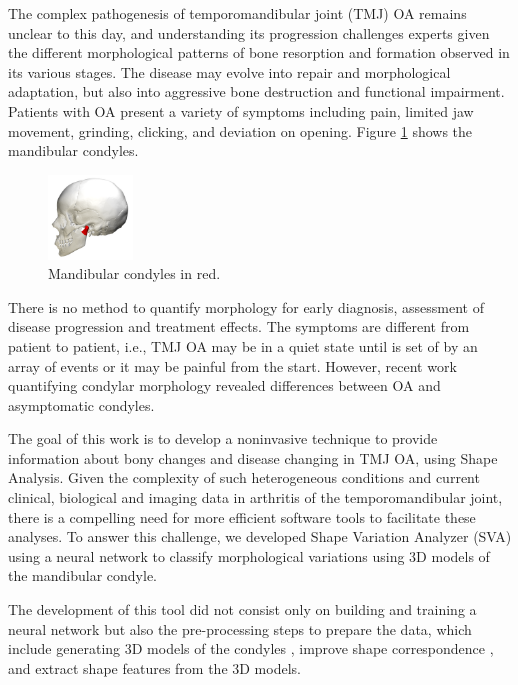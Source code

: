 \documentclass[]{spie}  %
\begin{document}
The complex pathogenesis of temporomandibular joint (TMJ) OA remains unclear to this day, and understanding its progression challenges experts given the different morphological patterns of bone resorption and formation observed in its various stages. The disease may evolve into repair and morphological adaptation, but also into aggressive bone destruction and functional impairment. 
Patients with OA present a variety of symptoms including pain, limited jaw movement, grinding, clicking, 
and deviation on opening.
Figure \ref{fig:mandibular} shows the mandibular condyles. 
\begin{figure}
    \centering
    \includegraphics[width=0.2\textwidth]{mandibular-condyles.png}
    \caption{Mandibular condyles in red.}
    \label{fig:mandibular}
\end{figure}
There is no method to quantify morphology for early diagnosis, assessment of disease progression and treatment effects. 
The symptoms are different from patient to patient, i.e., TMJ OA may be in a quiet state until is set of by an array 
of events or it may be painful from the start. However, recent work quantifying condylar morphology revealed 
differences between OA and asymptomatic condyles\cite{cevidanes2010quantification}.

The goal of this work is to develop a noninvasive technique to provide information about bony changes and disease changing in TMJ OA, using Shape Analysis. 
Given the complexity of such heterogeneous conditions and current clinical, biological and imaging data in arthritis of the temporomandibular joint, there is a compelling need for more efficient software tools to facilitate these analyses. To answer this challenge, we developed Shape Variation Analyzer (SVA) using a neural network to classify morphological variations using 3D models of the mandibular condyle. 

The development of this tool did not consist only on building and training a neural network but also
the pre-processing steps to prepare the data, which include generating 3D models of the condyles \cite{PANIAGUA2011345}, improve shape correspondence \cite{lyu2013group}, and extract shape features from the 3D models.
\end{document}
